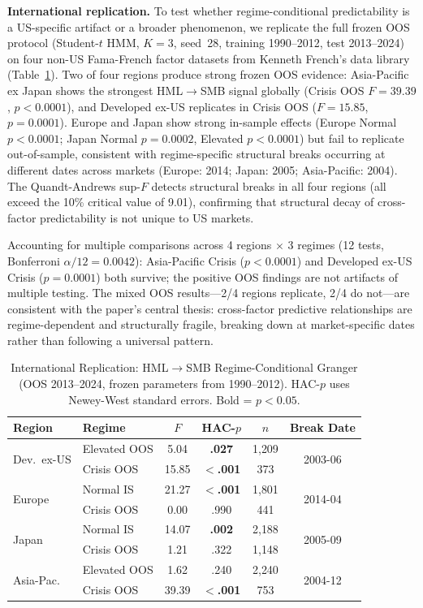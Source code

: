 \documentclass[sigconf,anonymous]{acmart}
\begin{document}
\textbf{International replication.}
To test whether regime-conditional predictability is a US-specific artifact
or a broader phenomenon, we replicate the full frozen OOS protocol
(Student-$t$ HMM, $K=3$, seed~28, training 1990--2012, test 2013--2024)
on four non-US Fama-French factor datasets from Kenneth French's data library
(Table~\ref{tab:international}).
Two of four regions produce strong frozen OOS evidence:
Asia-Pacific ex Japan shows the strongest HML$\to$SMB signal globally
(Crisis OOS $F = 39.39$, $p < 0.0001$), and Developed ex-US replicates
in Crisis OOS ($F = 15.85$, $p = 0.0001$).
Europe and Japan show strong in-sample effects (Europe Normal $p < 0.0001$;
Japan Normal $p = 0.0002$, Elevated $p < 0.0001$) but fail to replicate
out-of-sample, consistent with regime-specific structural breaks
occurring at different dates across markets
(Europe: 2014; Japan: 2005; Asia-Pacific: 2004).
The Quandt-Andrews sup-$F$ detects structural breaks in all four regions
(all exceed the 10\% critical value of 9.01), confirming that
structural decay of cross-factor predictability is not unique to US markets.

Accounting for multiple comparisons across 4 regions $\times$ 3 regimes
(12 tests, Bonferroni $\alpha/12 = 0.0042$): Asia-Pacific Crisis
($p < 0.0001$) and Developed ex-US Crisis ($p = 0.0001$) both survive;
the positive OOS findings are not artifacts of multiple testing.
The mixed OOS results---2/4 regions replicate, 2/4 do not---are
consistent with the paper's central thesis: cross-factor predictive
relationships are regime-dependent and structurally fragile,
breaking down at market-specific dates rather than following
a universal pattern.

\begin{table}[t]
\centering
\caption{International Replication: HML$\to$SMB Regime-Conditional Granger
(OOS 2013--2024, frozen parameters from 1990--2012). HAC-$p$ uses
Newey-West standard errors. Bold = $p < 0.05$.}
\label{tab:international}
\scriptsize
\begin{tabular}{@{}llcccc@{}}
\toprule
Region & Regime & $F$ & HAC-$p$ & $n$ & Break Date \\
\midrule
\multirow{2}{*}{Dev.\ ex-US} & Elevated OOS & 5.04 & \textbf{.027} & 1{,}209 & \multirow{2}{*}{2003-06} \\
 & Crisis OOS & 15.85 & \textbf{$<$.001} & 373 & \\
\midrule
\multirow{2}{*}{Europe} & Normal IS & 21.27 & \textbf{$<$.001} & 1{,}801 & \multirow{2}{*}{2014-04} \\
 & Crisis OOS & 0.00 & .990 & 441 & \\
\midrule
\multirow{2}{*}{Japan} & Normal IS & 14.07 & \textbf{.002} & 2{,}188 & \multirow{2}{*}{2005-09} \\
 & Crisis OOS & 1.21 & .322 & 1{,}148 & \\
\midrule
\multirow{2}{*}{Asia-Pac.} & Elevated OOS & 1.62 & .240 & 2{,}240 & \multirow{2}{*}{2004-12} \\
 & Crisis OOS & 39.39 & \textbf{$<$.001} & 753 & \\
\bottomrule
\end{tabular}
\end{table}
\end{document}
